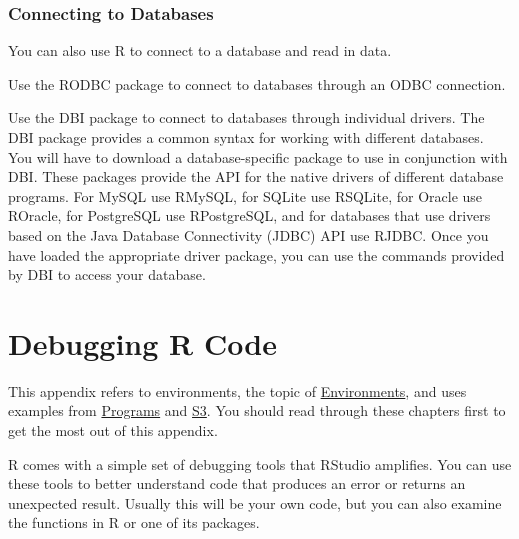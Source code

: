 \documentclass[
  letterpaper,
  DIV=11,
  numbers=noendperiod]{scrbook}
\begin{document}
\subsection{Connecting to Databases}\label{connecting-to-databases}

You can also use R to connect to a database and read in data.

Use the RODBC package to connect to databases through an ODBC
connection.

Use the DBI package to connect to databases through individual drivers.
The DBI package provides a common syntax for working with different
databases. You will have to download a database-specific package to use
in conjunction with DBI. These packages provide the API for the native
drivers of different database programs. For MySQL use RMySQL, for SQLite
use RSQLite, for Oracle use ROracle, for PostgreSQL use RPostgreSQL, and
for databases that use drivers based on the Java Database Connectivity
(JDBC) API use RJDBC. Once you have loaded the appropriate driver
package, you can use the commands provided by DBI to access your
database.

\chapter{Debugging R Code}\label{sec-appendix-debug}

\begin{tcolorbox}[enhanced jigsaw, breakable, colback=white, colbacktitle=quarto-callout-note-color!10!white, arc=.35mm, bottomrule=.15mm, coltitle=black, left=2mm, rightrule=.15mm, colframe=quarto-callout-note-color-frame, leftrule=.75mm, opacitybacktitle=0.6, bottomtitle=1mm, toptitle=1mm, titlerule=0mm, opacityback=0, title=\textcolor{quarto-callout-note-color}{\faInfo}\hspace{0.5em}{Note}, toprule=.15mm]

This appendix refers to environments, the topic of
\hyperref[sec-environments]{Environments}, and uses examples from
\hyperref[sec-programs]{Programs} and \hyperref[sec-s3]{S3}. You should
read through these chapters first to get the most out of this appendix.

\end{tcolorbox}

R comes with a simple set of debugging tools that RStudio amplifies. You
can use these tools to better understand code that produces an error or
returns an unexpected result. Usually this will be your own code, but
you can also examine the functions in R or one of its packages.
\end{document}
